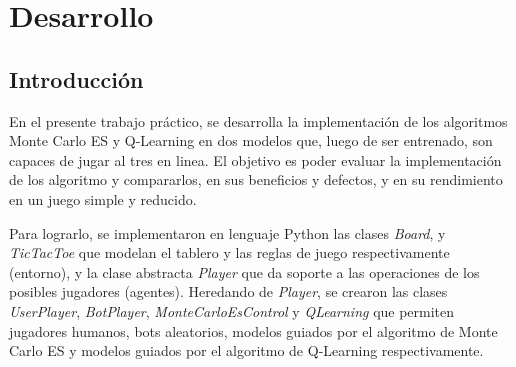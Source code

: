 
\chapter{Desarrollo} %

\label{Chapter1} %
\label{IntroGeneral}


\newcommand{\keyword}[1]{\textbf{#1}}
\newcommand{\tabhead}[1]{\textbf{#1}}
\newcommand{\code}[1]{\texttt{#1}}
\newcommand{\file}[1]{\texttt{\bfseries#1}}
\newcommand{\option}[1]{\texttt{\itshape#1}}
\newcommand{\grados}{$^{\circ}$}



\section{Introducción}

En el presente trabajo práctico, se desarrolla la implementación de los  algoritmos Monte Carlo ES y Q-Learning en dos modelos que, luego de ser entrenado, son capaces de jugar al tres en linea. El objetivo es poder evaluar la implementación de los algoritmo y compararlos, en sus beneficios y defectos, y en su rendimiento en un juego simple y reducido.

Para lograrlo, se implementaron en lenguaje Python las clases \textit{Board}, y \textit{TicTacToe} que modelan el tablero y las reglas de juego respectivamente (entorno), y la clase abstracta \textit{Player} que da soporte a las operaciones de los posibles jugadores (agentes). Heredando de \textit{Player}, se crearon las clases \textit{UserPlayer}, \textit{BotPlayer},  \textit{MonteCarloEsControl} y \textit{QLearning}  que permiten jugadores humanos, bots aleatorios, modelos guiados por el algoritmo de Monte Carlo ES y modelos guiados por el algoritmo de Q-Learning respectivamente.

